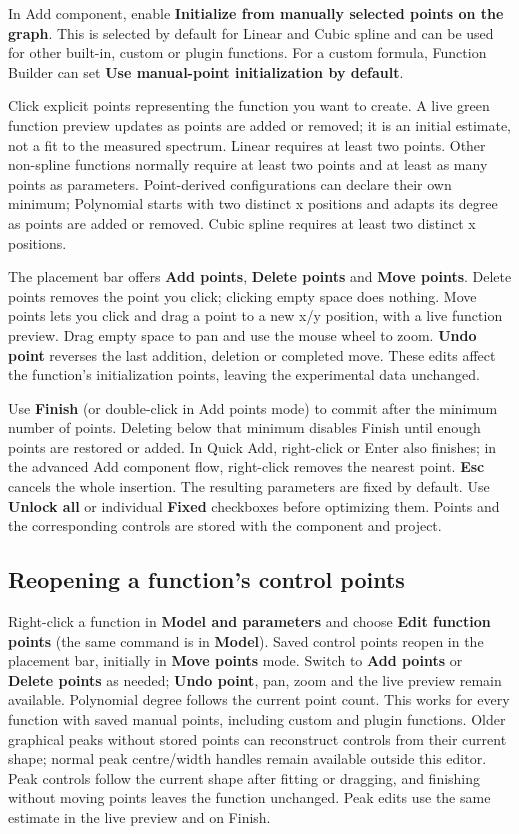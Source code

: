 \documentclass[
  10pt,
  a4paper,
  oneside]{scrreprt}
\begin{document}
In Add component, enable \textbf{Initialize from manually selected
points on the graph}. This is selected by default for Linear and Cubic
spline and can be used for other built-in, custom or plugin functions.
For a custom formula, Function Builder can set \textbf{Use manual-point
initialization by default}.

Click explicit points representing the function you want to create. A
live green function preview updates as points are added or removed; it
is an initial estimate, not a fit to the measured spectrum. Linear
requires at least two points. Other non-spline functions normally
require at least two points and at least as many points as parameters.
Point-derived configurations can declare their own minimum; Polynomial
starts with two distinct x positions and adapts its degree as points are
added or removed. Cubic spline requires at least two distinct x
positions.

The placement bar offers \textbf{Add points}, \textbf{Delete points} and
\textbf{Move points}. Delete points removes the point you click;
clicking empty space does nothing. Move points lets you click and drag a
point to a new x/y position, with a live function preview. Drag empty
space to pan and use the mouse wheel to zoom. \textbf{Undo point}
reverses the last addition, deletion or completed move. These edits
affect the function's initialization points, leaving the experimental
data unchanged.

Use \textbf{Finish} (or double-click in Add points mode) to commit after
the minimum number of points. Deleting below that minimum disables
Finish until enough points are restored or added. In Quick Add,
right-click or Enter also finishes; in the advanced Add component flow,
right-click removes the nearest point. \textbf{Esc} cancels the whole
insertion. The resulting parameters are fixed by default. Use
\textbf{Unlock all} or individual \textbf{Fixed} checkboxes before
optimizing them. Points and the corresponding controls are stored with
the component and project.

\hypertarget{reopening-a-functions-control-points}{%
\subsection{Reopening a function's control
points}\label{reopening-a-functions-control-points}}

Right-click a function in \textbf{Model and parameters} and choose
\textbf{Edit function points} (the same command is in \textbf{Model}).
Saved control points reopen in the placement bar, initially in
\textbf{Move points} mode. Switch to \textbf{Add points} or
\textbf{Delete points} as needed; \textbf{Undo point}, pan, zoom and the
live preview remain available. Polynomial degree follows the current
point count. This works for every function with saved manual points,
including custom and plugin functions. Older graphical peaks without
stored points can reconstruct controls from their current shape; normal
peak centre/width handles remain available outside this editor. Peak
controls follow the current shape after fitting or dragging, and
finishing without moving points leaves the function unchanged. Peak
edits use the same estimate in the live preview and on Finish.
\end{document}

